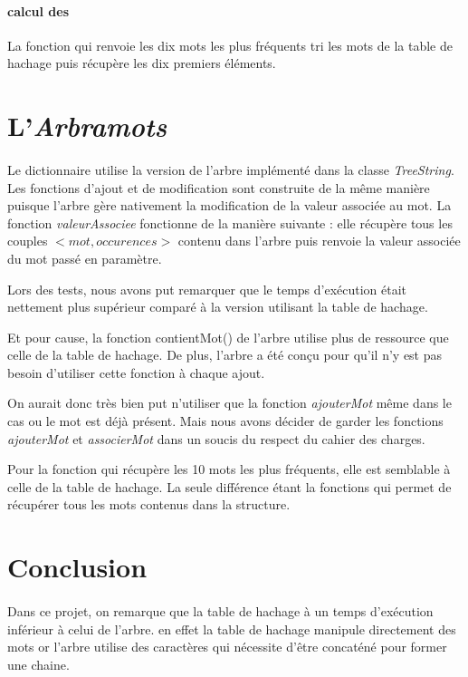 \documentclass[12pt,a4paper,final]{article}
\begin{document}
	\paragraph{calcul des}{La fonction qui renvoie les dix mots les plus fréquents tri les mots de la table de hachage puis récupère les dix premiers éléments.}
	
	
\newpage 

\section{L'\emph{Arbramots}}

	\paragraph{}{
Le dictionnaire utilise la version de l'arbre implémenté dans la classe \textit{TreeString}.
Les fonctions d'ajout et de modification sont construite de la même manière puisque l'arbre gère nativement la modification de la valeur associée au mot.
La fonction \textit{valeurAssociee} fonctionne de la manière suivante : elle récupère tous les couples $<mot,occurences>$ contenu dans l'arbre puis renvoie la valeur associée du mot passé en paramètre.

Lors des tests, nous avons put remarquer que le temps d’exécution était nettement plus supérieur comparé à la version utilisant la table de hachage. 

Et pour cause, la fonction contientMot() de l'arbre utilise plus de ressource que celle de la table de hachage. De plus, l'arbre a été conçu pour qu'il n'y est pas besoin d'utiliser cette fonction à chaque ajout. 

On aurait donc très bien put n'utiliser que la fonction \textit{ajouterMot} même dans le cas ou le mot est déjà présent. Mais nous avons décider de garder les fonctions \textit{ajouterMot} et \textit{associerMot} dans un soucis du respect du cahier des charges.

Pour la fonction qui récupère les 10 mots les plus fréquents, elle est semblable à celle de la table de hachage. La seule différence étant la fonctions qui permet de récupérer tous les mots contenus dans la structure.
}
\newpage
  
\section*{Conclusion}
\paragraph{}{
Dans ce projet, on remarque que la table de hachage à un temps d'exécution inférieur à celui de l'arbre. en effet la table de hachage manipule directement des mots or l'arbre utilise des caractères qui nécessite d'être concaténé pour former une chaine. 
}
\end{document}
